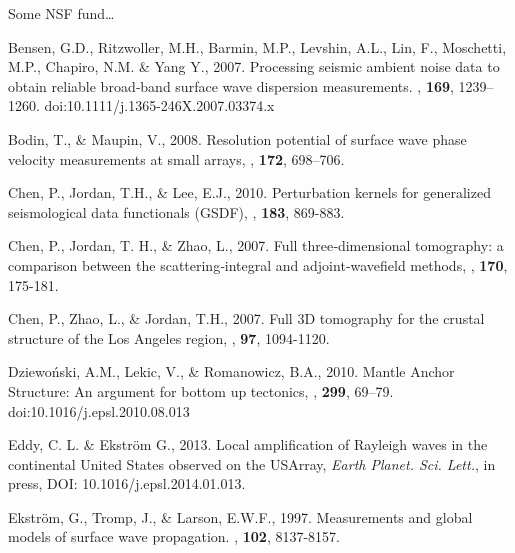 \documentclass[referee]{gji}
\begin{document}
\begin{acknowledgments}
	Some NSF fund\ldots 
\end{acknowledgments}

\begin{thebibliography}{}

	   Bensen, G.D., Ritzwoller, M.H., Barmin, M.P., Levshin, A.L., Lin, F., Moschetti, M.P., Chapiro, N.M. \& Yang Y., 2007. Processing seismic ambient noise data to obtain reliable broad‐band surface wave dispersion measurements. \textit{\gjras}, \textbf{169}, 1239–1260. doi:10.1111/j.1365-246X.2007.03374.x

	   Bodin, T., \& Maupin, V., 2008. Resolution potential of surface wave phase velocity measurements at small arrays, \textit{\gji}, \textbf{172}, 698–706.

	   Chen, P., Jordan, T.H., \& Lee, E.J., 2010. Perturbation kernels for generalized seismological data functionals (GSDF), \textit{\gji}, \textbf{183}, 869-883.

	   Chen, P., Jordan, T. H., \& Zhao, L., 2007. Full three‐dimensional tomography: a comparison between the scattering‐integral and adjoint‐wavefield methods, \textit{\gji}, \textbf{170}, 175-181.

	   Chen, P., Zhao, L., \& Jordan, T.H., 2007. Full 3D tomography for the crustal structure of the Los Angeles region, \textit{\bssa}, \textbf{97}, 1094-1120.

	   Dziewo\'{n}ski, A.M., Lekic, V., \& Romanowicz, B.A., 2010. Mantle Anchor Structure: An argument for bottom up tectonics, \textit{\epsl}, \textbf{299}, 69–79. doi:10.1016/j.epsl.2010.08.013

	   Eddy, C. L. \& Ekstr\"{o}m G., 2013. Local ampliﬁcation of Rayleigh waves in the continental United States observed on the USArray, \textit{Earth Planet. Sci. Lett.}, in press, DOI: 10.1016/j.epsl.2014.01.013.

	   Ekstr\"{o}m, G., Tromp, J., \& Larson, E.W.F., 1997. Measurements and global models of surface wave propagation. \textit{\jgr}, \textbf{102}, 8137-8157. 


\end{thebibliography}
\end{document}
